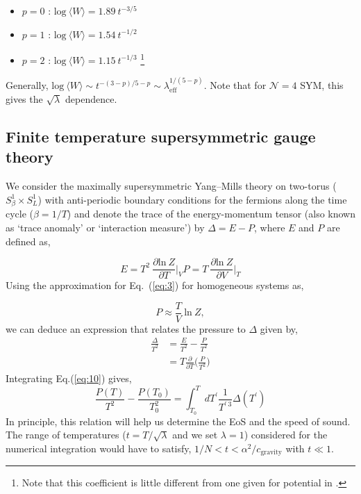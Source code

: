 \begin{itemize} 
\item $p = 0$ : $ \text{log} ~ \langle W \rangle = 1.89~t^{-3/5}$
\item $p = 1$ : $ \text{log} ~ \langle W \rangle = 1.54~t^{-1/2}$
\item $p = 2$ : $ \text{log} ~ \langle W \rangle = 1.15~t^{-1/3}$  \footnote{Note that this coefficient is little different from one given for potential in \cite{Malacena:Wilson loop}. } 
\end{itemize}  
Generally, $\text{log} ~ \langle W \rangle \sim t^{-(3-p)/5-p}  \sim \lambda_{\mathrm{eff}}^{1/(5-p)}$. Note that
for $\mathcal{N} = 4$ SYM, this gives the $\sqrt{\lambda}$ dependence. 

\subsection{Finite temperature supersymmetric gauge theory} 

We consider the maximally supersymmetric Yang--Mills theory on two-torus ($S^{1}_{\beta} \times S^{1}_{L}$) with anti-periodic 
boundary conditions for the fermions along the time cycle ($\beta = 1/T$) and denote the trace of the energy-momentum
tensor (also known as `trace anomaly' or `interaction measure') by $ \Delta 
= E - P $, where $E$ and $P$ are defined as, 

\begin{equation}
E = T^2 ~ \frac{\partial \text{ln}~ Z}{\partial T}  \bigg\rvert_{V}
P = T ~ \frac{\partial \text{ln}~ Z}{\partial V}  \bigg\rvert_{T}  \label{eq:3}
\end{equation}
Using the approximation for Eq.~(\ref{eq:3}) for homogeneous systems as, 

\begin{equation}
P \approx \frac{T}{V} ~ \text{ln}~ Z ,  
\label{eq:8}
\end{equation}
we can deduce an expression that relates the pressure to $\Delta$ given by, 
\begin{align}
\frac{\Delta}{T^2} &= \frac{E}{T^2} - \frac{P}{T^2} \nonumber  \\  
&= T \frac{\partial}{\partial T} \Big(\frac{P}{T^2}\Big) \label{eq:10}    
\end{align}
Integrating Eq.(\ref{eq:10}) gives, 
\begin{equation}
\frac{P(T)}{T^2} - \frac{P(T_{0})}{T_{0}^2} = \int_{T_{0}}^{T} dT^{\prime} \frac{1}{T^{\prime ~ 3}} \Delta(T^{\prime})
\label{eq:7}
\end{equation}
In principle, this relation will help us determine the EoS and the speed of sound. The range of temperatures ($t = T/\sqrt{\lambda}$ and we set $\lambda = 1$)
considered for the numerical integration would have to satisfy, $ 1/N < t < \alpha^2 / c_{\text{gravity}} $ with $ t \ll 1$. 


